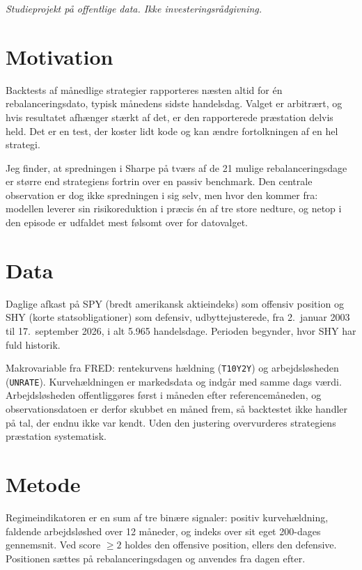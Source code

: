 \documentclass[11pt,a4paper]{article}
\begin{document}
\vfill
\begin{center}\small\textit{Studieprojekt på offentlige data. Ikke investeringsrådgivning.}\end{center}
\clearpage\setcounter{page}{1}

\section{Motivation}
Backtests af månedlige strategier rapporteres næsten altid for én
rebalanceringsdato, typisk månedens sidste handelsdag. Valget er arbitrært, og
hvis resultatet afhænger stærkt af det, er den rapporterede præstation delvis
held. Det er en test, der koster lidt kode og kan ændre fortolkningen af en hel
strategi.

Jeg finder, at spredningen i Sharpe på tværs af de 21 mulige
rebalanceringsdage er større end strategiens fortrin over en passiv
benchmark. Den centrale observation er dog ikke spredningen i sig selv, men
hvor den kommer fra: modellen leverer sin risikoreduktion i præcis én af tre
store nedture, og netop i den episode er udfaldet mest følsomt over for
datovalget.

\section{Data}
Daglige afkast på SPY (bredt amerikansk aktieindeks) som offensiv position og
SHY (korte statsobligationer) som defensiv, udbyttejusterede, fra
2.~januar 2003 til 17.~september 2026, i alt 5.965 handelsdage. Perioden
begynder, hvor SHY har fuld historik.

Makrovariable fra FRED: rentekurvens hældning (\texttt{T10Y2Y}) og
arbejdsløsheden (\texttt{UNRATE}). Kurvehældningen er markedsdata og indgår med
samme dags værdi. Arbejdsløsheden offentliggøres først i måneden efter
referencemåneden, og observationsdatoen er derfor skubbet en måned frem, så
backtestet ikke handler på tal, der endnu ikke var kendt. Uden den justering
overvurderes strategiens præstation systematisk.

\section{Metode}
Regimeindikatoren er en sum af tre binære signaler: positiv kurvehældning,
faldende arbejdsløshed over 12 måneder, og indeks over sit eget 200-dages
gennemsnit. Ved score $\geq 2$ holdes den offensive position, ellers den
defensive. Positionen sættes på rebalanceringsdagen og anvendes fra dagen efter.
\end{document}
